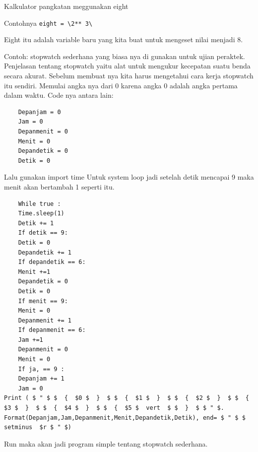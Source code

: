 Kalkulator pangkatan meggunakan eight 

Contohnya \verb|eight = \2** 3\| 

Eight itu adalah variable baru yang kita buat untuk mengeset nilai menjadi 8.

Contoh: stopwatch sederhana yang biasa nya di gunakan untuk ujian peraktek.  
Penjelasan tentang stopwatch yaitu alat untuk mengukur kecepatan suatu benda secara akurat. 
Sebelum membuat nya kita harus mengetahui cara kerja stopwatch itu sendiri. Memulai angka nya dari 0 karena angka 0 adalah angka pertama dalam waktu.
Code nya antara lain:
 \begin{verbatim}
	Depanjam = 0 
	Jam = 0 
	Depanmenit = 0 
	Menit = 0 
	Depandetik = 0 
	Detik = 0
 \end{verbatim}
Lalu gunakan import time 
Untuk system loop jadi setelah detik mencapai 9 maka menit akan bertambah 1 seperti itu. 
 \begin{verbatim}
	While true : 
	Time.sleep(1) 
	Detik += 1 
	If detik == 9: 
	Detik = 0 
	Depandetik += 1 
	If depandetik == 6:
	Menit +=1 
	Depandetik = 0 
	Detik = 0 
	If menit == 9: 
	Menit = 0 
	Depanmenit += 1 
	If depanmenit == 6: 
	Jam +=1 
	Depanmenit = 0 
	Menit = 0 
	If ja, == 9 : 
	Depanjam += 1 
	Jam = 0 
Print ( $ " $ $  {  $0 $  }  $ $  {  $1 $  }  $ $  {  $2 $  }  $ $  {  $3 $  }  $ $  {  $4 $  }  $ $  {  $5 $  vert  $ $  }  $ $ " $. Format(Depanjam,Jam,Depanmenit,Menit,Depandetik,Detik), end= $ " $ $  setminus  $r $ " $) 
\end{verbatim}
Run maka akan jadi program simple tentang stopwatch sederhana.

